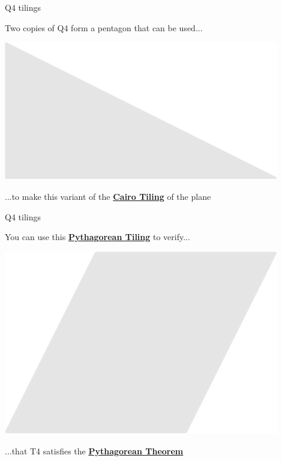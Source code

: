 \documentclass[14pt]{beamer}
\begin{document}

    \begin{frame}{Q4 tilings}
        \begin{center}
            Two copies of Q4 form a pentagon that can be used...

            \bigskip \bigskip

            \includegraphics[width=0.9\textwidth]{figures/figure023c.pdf}

            \bigskip \bigskip

            ...to make this variant of the \textbf{\href{https://en.wikipedia.org/wiki/Cairo_pentagonal_tiling}{Cairo Tiling}} of the plane
        \end{center}
    \end{frame}


    \begin{frame}{Q4 tilings}
        \begin{center}
            You can use this \textbf{\href{https://en.wikipedia.org/wiki/Pythagorean_tiling}{Pythagorean Tiling}} to verify...

            \bigskip \bigskip

            \includegraphics[width=0.9\textwidth]{figures/figure023f.pdf}

            \bigskip \bigskip

            ...that T4 satisfies the \textbf{\href{https://en.wikipedia.org/wiki/Pythagorean_theorem}{Pythagorean Theorem}}
        \end{center}
    \end{frame}
\end{document}
